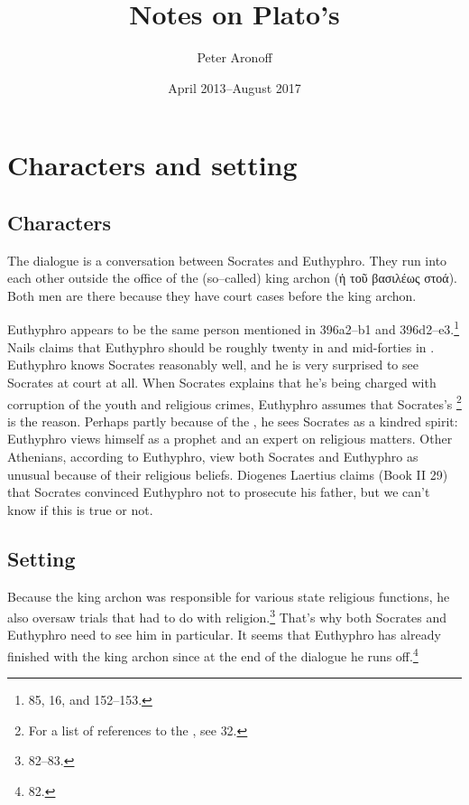 \documentclass[11pt]{article}
\begin{document}
\begin{titlepage}
\title{Notes on Plato's }
\author{Peter Aronoff}
\date{April 2013--August 2017}
\maketitle
\thispagestyle{empty}
\end{titlepage}

\section{Characters and setting}

\subsection{Characters}

The dialogue is a conversation between Socrates and Euthyphro.  They run into each other outside the office of the (so--called) king archon ({\g ἡ τοῦ βασιλέως στοά}).  Both men are there because they have court cases before the king archon.

Euthyphro appears to be the same person mentioned in  396a2--b1 and 396d2--e3.\footnote{\citet{burnet1924} 85, \citet{bailly2003} 16, and \citet{nails2002} 152--153.}  Nails claims that Euthyphro should be roughly twenty in  and mid-forties in .  Euthyphro knows Socrates reasonably well, and he is very surprised to see Socrates at court at all.  When Socrates explains that he's being charged with corruption of the youth and religious crimes, Euthyphro assumes that Socrates's \footnote{For a list of references to the , see \citet{bailly2003} 32.} is the reason.  Perhaps partly because of the , he sees Socrates as a kindred spirit: Euthyphro views himself as a prophet and an expert on religious matters.  Other Athenians, according to Euthyphro, view both Socrates and Euthyphro as unusual because of their religious beliefs.  Diogenes Laertius claims (Book II 29) that Socrates convinced Euthyphro not to prosecute his father, but we can't know if this is true or not.

\subsection{Setting}

Because the king archon was responsible for various state religious functions, he also oversaw trials that had to do with religion.\footnote{\citet{burnet1924} 82--83.}  That's why both Socrates and Euthyphro need to see him in particular.  It seems that Euthyphro has already finished with the king archon since at the end of the dialogue he runs off.\footnote{\citet{burnet1924} 82.}
\end{document}
